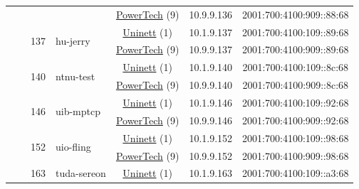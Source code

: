\begin{small}
\begin{center}
\begin{longtable}{|c|c|c|c|c|c|c|c|}
  &  &  &  & \multicolumn{2}{|c|}{\tiny{\href{http://www.powertech.no}{PowerTech} (9)}} & \tiny{10.9.9.136} & \tiny{2001:700:4100:909::88:68} \\* \cline{3-3}\cline{4-4}\cline{5-5}\cline{6-6}\cline{7-7}\cline{8-8}
  &  & \multirow{2}{*}{\tiny{137}} & \multicolumn{1}{|l|}{\multirow{2}{*}{\tiny{hu-jerry}}} & \multicolumn{2}{|c|}{\tiny{\href{https://www.uninett.no}{Uninett} (1)}} & \tiny{10.1.9.137} & \tiny{2001:700:4100:109::89:68} \\* \cline{5-5}\cline{6-6}\cline{7-7}\cline{8-8}
  &  &  &  & \multicolumn{2}{|c|}{\tiny{\href{http://www.powertech.no}{PowerTech} (9)}} & \tiny{10.9.9.137} & \tiny{2001:700:4100:909::89:68} \\* \cline{3-3}\cline{4-4}\cline{5-5}\cline{6-6}\cline{7-7}\cline{8-8}
  &  & \multirow{2}{*}{\tiny{140}} & \multicolumn{1}{|l|}{\multirow{2}{*}{\tiny{ntnu-test}}} & \multicolumn{2}{|c|}{\tiny{\href{https://www.uninett.no}{Uninett} (1)}} & \tiny{10.1.9.140} & \tiny{2001:700:4100:109::8c:68} \\* \cline{5-5}\cline{6-6}\cline{7-7}\cline{8-8}
  &  &  &  & \multicolumn{2}{|c|}{\tiny{\href{http://www.powertech.no}{PowerTech} (9)}} & \tiny{10.9.9.140} & \tiny{2001:700:4100:909::8c:68} \\* \cline{3-3}\cline{4-4}\cline{5-5}\cline{6-6}\cline{7-7}\cline{8-8}
  &  & \multirow{2}{*}{\tiny{146}} & \multicolumn{1}{|l|}{\multirow{2}{*}{\tiny{uib-mptcp}}} & \multicolumn{2}{|c|}{\tiny{\href{https://www.uninett.no}{Uninett} (1)}} & \tiny{10.1.9.146} & \tiny{2001:700:4100:109::92:68} \\* \cline{5-5}\cline{6-6}\cline{7-7}\cline{8-8}
  &  &  &  & \multicolumn{2}{|c|}{\tiny{\href{http://www.powertech.no}{PowerTech} (9)}} & \tiny{10.9.9.146} & \tiny{2001:700:4100:909::92:68} \\* \cline{3-3}\cline{4-4}\cline{5-5}\cline{6-6}\cline{7-7}\cline{8-8}
  &  & \multirow{2}{*}{\tiny{152}} & \multicolumn{1}{|l|}{\multirow{2}{*}{\tiny{uio-fling}}} & \multicolumn{2}{|c|}{\tiny{\href{https://www.uninett.no}{Uninett} (1)}} & \tiny{10.1.9.152} & \tiny{2001:700:4100:109::98:68} \\* \cline{5-5}\cline{6-6}\cline{7-7}\cline{8-8}
  &  &  &  & \multicolumn{2}{|c|}{\tiny{\href{http://www.powertech.no}{PowerTech} (9)}} & \tiny{10.9.9.152} & \tiny{2001:700:4100:909::98:68} \\* \cline{3-3}\cline{4-4}\cline{5-5}\cline{6-6}\cline{7-7}\cline{8-8}
  &  & \multirow{2}{*}{\tiny{163}} & \multicolumn{1}{|l|}{\multirow{2}{*}{\tiny{tuda-sereon}}} & \multicolumn{2}{|c|}{\tiny{\href{https://www.uninett.no}{Uninett} (1)}} & \tiny{10.1.9.163} & \tiny{2001:700:4100:109::a3:68} \\* \cline{5-5}\cline{6-6}\cline{7-7}\cline{8-8}

\end{longtable}
\end{center}
\end{small}
